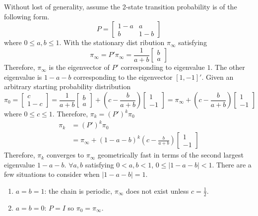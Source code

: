 \documentclass[a4paper, 11pt]{article}
\begin{document}
Without lost of generality, assume the 2-state transition probability is of the following form. 
\begin{equation}
P = \begin{bmatrix}
1-a & a \\
b & 1-b
\end{bmatrix}
\end{equation}
where $0 \leq a, b \leq 1$. With the stationary dist
ribution $\pi_\infty$ satisfying 
\begin{equation}
\pi_\infty = P' \pi_\infty = \frac{1}{a+b}\begin{bmatrix}
b \\
a
\end{bmatrix}
\end{equation}
Therefore, $\pi_\infty$ is the eigenvector of $P'$ corresponding to eigenvalue $1$. The other eigenvalue is $1-a-b$ corresponding to the eigenvector $[1, -1]'$. Given an arbitrary starting probability distribution 
\begin{equation}
\pi_0 = \begin{bmatrix}
c \\
1-c
\end{bmatrix} = \frac{1}{a+b}\begin{bmatrix}
b \\
a
\end{bmatrix} + \left(c - \frac{b}{a+b} \right)\begin{bmatrix}
1 \\
-1
\end{bmatrix} = \pi_\infty + \left(c - \frac{b}{a+b} \right)\begin{bmatrix}
1 \\
-1
\end{bmatrix}
\end{equation}
where $0 \leq c \leq 1$. Therefore, $\pi_k = (P')^k \pi_0$
\begin{equation}
\begin{split}
\pi_k & = (P')^k \pi_0 \\ 
 & = \pi_\infty + (1-a-b)^k\left(c - \frac{b}{a+b} \right)\begin{bmatrix}
1 \\
-1
\end{bmatrix}
\end{split}
\end{equation}
Therefore, $\pi_k$ converges to $\pi_\infty$ geometrically fast in terms of the second largest eigenvalue $1-a-b$. $\forall a,b$ satisfying $0 < a, b < 1$, $0 \leq |1-a-b| < 1$. There are a few situations to consider when $|1-a-b| = 1$. 
\begin{enumerate}
	\item $a=b=1$: the chain is periodic, $\pi_\infty$ does not exist unless $c=\frac{1}{2}$. 
	\item $a=b=0$: $P=I$ so $\pi_0 = \pi_\infty$.
\end{enumerate}
\end{document}
